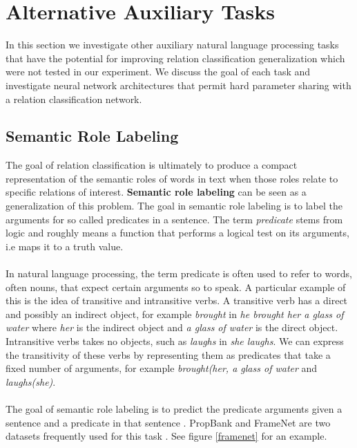 \section{Alternative Auxiliary Tasks}
In this section we investigate other auxiliary natural language processing tasks that have the potential for improving relation classification generalization which were not tested in our experiment. We discuss the goal of each task and investigate neural network architectures that permit hard parameter sharing with a relation classification network.

\subsection{Semantic Role Labeling}
The goal of relation classification is ultimately to produce a compact representation of the semantic roles of words in text when those roles relate to specific relations of interest. \textbf{Semantic role labeling} can be seen as a generalization of this problem. The goal in semantic role labeling is to label the arguments for so called predicates in a sentence. The term \textit{predicate} stems from logic and roughly means a function that performs a logical test on its arguments, i.e maps it to a truth value. 
\\\\
In natural language processing, the term predicate is often used to refer to words, often nouns, that expect certain arguments so to speak. A particular example of this is the idea of transitive and intransitive verbs. A transitive verb has a direct and possibly an indirect object, for example \textit{brought} in \textit{he brought her a glass of water} where \textit{her} is the indirect object and \textit{a glass of water} is the direct object. Intransitive verbs takes no objects, such as \textit{laughs} in \textit{she laughs}. We can express the transitivity of these verbs by representing them as predicates that take a fixed number of arguments, for example \textit{brought(her, a glass of water} and \textit{laughs(she)}.
\\\\
The goal of semantic role labeling is to predict the predicate arguments given a sentence and a predicate in that sentence \citep{jurafsky09}. PropBank and FrameNet are two datasets frequently used for this task \citep{kingsbury2002, baker1998}. See figure \ref{framenet} for an example.

